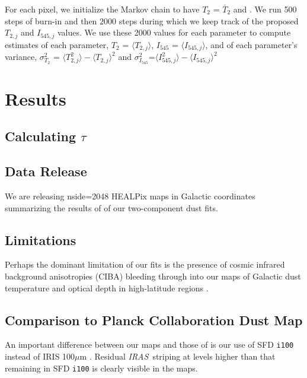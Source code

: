 \documentclass{emulateapj}
\newcommand{\IRAS}{{\it IRAS}}
\begin{document}
For each pixel, we initialize the Markov chain to have $T_2$ = $\bar{T}_2$ and
. We run 500 steps of burn-in and then 2000 steps during which we keep track
of the proposed $T_{2, j}$ and $I_{545, j}$ values. We use these 2000 values 
for each parameter to compute estimates of each parameter,  $T_2$ = 
$\langle T_{2, j} \rangle$, $I_{545}$ = $\langle I_{545, j} \rangle$, and of 
each parameter's variance, $\sigma^2_{T_2}$ = $\langle T^2_{2, j} \rangle-\langle T_{2, j} \rangle ^2$ and $\sigma^2_{I_{545}}$=$\langle I^2_{545, j} 
\rangle-\langle I_{545, j} \rangle ^2$

\section{Results}
\label{sec:results}

\subsection{Calculating $\tau$}

\subsection{Data Release}
We are releasing nside=2048 HEALPix maps in Galactic coordinates summarizing 
the results of of our two-component dust fits.


\subsection{Limitations}
Perhaps the dominant limitation of our fits is the presence of cosmic
infrared background anisotropies (CIBA) bleeding through into our maps of 
Galactic dust temperature and optical depth in high-latitude regions 
\citep{ciba}.

\subsection{Comparison to Planck Collaboration Dust Map}
An important difference between our maps and those of \cite{planckdust} is our 
use of SFD \verb|i100| instead of IRIS 100$\mu$m \citep{IRIS}. Residual 
\IRAS~striping at levels higher than that remaining in SFD \verb|i100| is 
clearly visible in the \cite{planckdust} maps.
\end{document}
